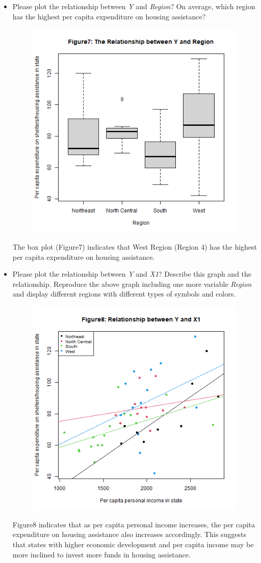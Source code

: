 \documentclass[12pt,letterpaper]{article}
\begin{document}
\begin{itemize}
\item
Please plot the relationship between \emph{Y} and \emph{Region}? On average, which region has the highest per capita expenditure on housing assistance?

\begin{figure}[H]
	\centering
	\includegraphics[width=.55\textwidth]{Y~Region.png}
\end{figure}
\noindent The box plot (Figure7) indicates that West Region (Region 4) has the highest per capita expenditure on housing assistance. \\

\item
Please plot the relationship between \emph{Y} and \emph{X1}? Describe this graph and the relationship. Reproduce the above graph including one more variable \emph{Region} and display different regions with different types of symbols and colors.
 
\begin{figure}[H]
	\centering
	\includegraphics[width=.6\textwidth]{Y~X1_Region.png}
\end{figure} 
\noindent Figure8 indicates that as per capita personal income increases, the per capita expenditure on housing assistance also increases accordingly. This suggests that states with higher economic development and per capita income may be more inclined to invest more funds in housing assistance. \\

\end{itemize}
\end{document}
